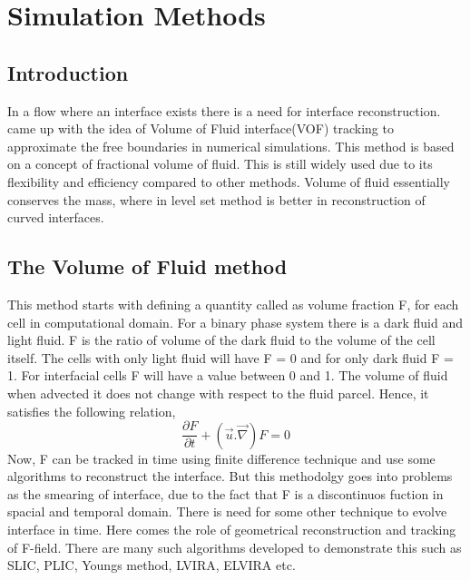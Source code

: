 \chapter{Simulation Methods}

\section{Introduction}
In a flow where an interface exists there is a need for interface reconstruction. \cite{Hirt1981} came up with the idea of Volume of Fluid interface{(VOF)} tracking to approximate
the free boundaries in numerical simulations. This method is based on a concept of fractional volume of fluid. This is still widely used due to its flexibility and efficiency
compared to other methods.
Volume of fluid essentially conserves the mass, where in level set method is better in reconstruction of curved interfaces.

\section{The Volume of Fluid method}
This method starts with defining a quantity called as volume fraction F, for each cell in computational domain. For a binary phase system there is a dark fluid and light fluid.
F is the ratio of volume of the dark fluid to the volume of the cell itself. The cells with only light fluid will have F = 0 and for only dark fluid F = 1. For interfacial cells
F will have a value between 0 and 1. The volume of fluid when advected it does not change with respect to the fluid parcel. Hence, it satisfies the following relation,
\begin{equation}
 \frac{\partial F}{\partial t}+(\overrightarrow u. \overrightarrow \nabla)F=0
\end{equation}
Now, F can be tracked in time using finite difference technique and use some algorithms to reconstruct the interface. But this methodolgy goes into problems as the smearing of interface,
due to the fact that F is a discontinuos fuction in spacial and temporal domain. There is need for some other technique to evolve interface in time. Here comes the role of geometrical reconstruction
and tracking of F-field. There are many such algorithms developed to demonstrate this such as SLIC, PLIC, Youngs method, LVIRA, ELVIRA etc.

